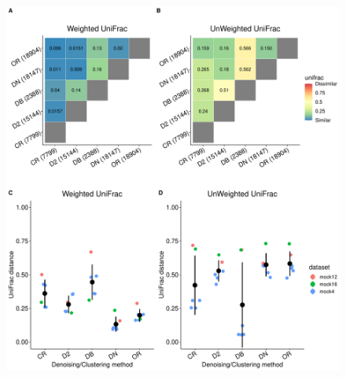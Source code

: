\documentclass[letterpaper,12pt]{article}
\providecommand{\DIFdelbegin}{} %
\providecommand{\DIFaddbeginFL}{} %
\providecommand{\DIFaddendFL}{} %
\providecommand{\DIFdelendFL}{} %
\newcommand{\DIFscaledelfig}{0.5}
\newlength{\DIFdelgraphicswidth} %
\newlength{\DIFdelgraphicsheight} %
\newcommand{\DIFaddincludegraphics}[2][]{{\color{blue}\fbox{\DIFOincludegraphics[#1]{#2}}}} %
\newcommand{\DIFdelincludegraphics}[2][]{%
\sbox{\DIFdelgraphicsbox}{\DIFOincludegraphics[#1]{#2}}%
\settoboxwidth{\DIFdelgraphicswidth}{\DIFdelgraphicsbox} %
\settoboxtotalheight{\DIFdelgraphicsheight}{\DIFdelgraphicsbox} %
\scalebox{\DIFscaledelfig}{%
\parbox[b]{\DIFdelgraphicswidth}{\usebox{\DIFdelgraphicsbox}\\[-\baselineskip] \rule{\DIFdelgraphicswidth}{0em}}\llap{\resizebox{\DIFdelgraphicswidth}{\DIFdelgraphicsheight}{%
\setlength{\unitlength}{\DIFdelgraphicswidth}%
\begin{picture}(1,1)%
\thicklines\linethickness{2pt} %
{\color[rgb]{1,0,0}\put(0,0){\framebox(1,1){}}}%
{\color[rgb]{1,0,0}\put(0,0){\line( 1,1){1}}}%
{\color[rgb]{1,0,0}\put(0,1){\line(1,-1){1}}}%
\end{picture}%
}\hspace*{3pt}}} %
} %
\DeclareRobustCommand{\DIFdelbegin}{\DIFOdelbegin \let\includegraphics\DIFdelincludegraphics} %
\DeclareRobustCommand{\DIFaddbeginFL}{\DIFOaddbeginFL \let\includegraphics\DIFaddincludegraphics} %
\DeclareRobustCommand{\DIFaddendFL}{\DIFOaddendFL \let\includegraphics\DIFOincludegraphics} %
\DeclareRobustCommand{\DIFdelendFL}{\DIFOaddendFL \let\includegraphics\DIFOincludegraphics} %
\begin{document}
  \DIFdelbegin %
\DIFdelendFL \DIFaddbeginFL \begin{figure}[H]
    \DIFaddendFL \centering
    \includegraphics[width=\textwidth]{figure3.pdf}
  \DIFaddbeginFL \end{figure}
\end{document}
